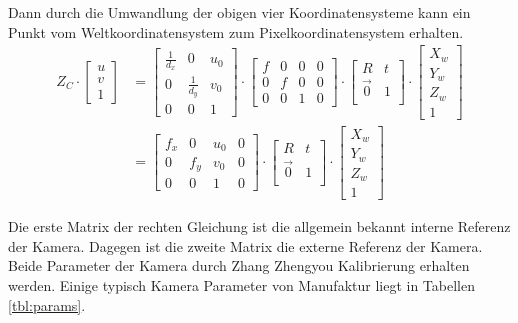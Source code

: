 Dann durch die Umwandlung der obigen vier Koordinatensysteme kann ein Punkt vom Weltkoordinatensystem zum Pixelkoordinatensystem erhalten.
\begin{equation}
\begin{split}
   Z_C \cdot \begin{bmatrix}
	u \\  
	v \\
	1
	\end{bmatrix} & = \begin{bmatrix}
	\frac{1}{d_x} 			& 0 			& u_0	\\
	0	 					& \frac{1}{d_y} & v_0	\\
	0     					& 0 			& 1	
	\end{bmatrix} \cdot \begin{bmatrix}
	f & 0 & 0 & 0	\\
	0 & f & 0 & 0	\\
	0 & 0 & 1 & 0	
	\end{bmatrix} \cdot \begin{bmatrix}
	R & t	\\
	\vec{0}	& 1 \\
	\end{bmatrix} \cdot \begin{bmatrix}
	X_w \\  
	Y_w \\
	Z_w \\
	1
	\end{bmatrix} \\
	& = \begin{bmatrix}
	f_x & 0 & u_0 & 0	\\
	0 & f_y & v_0 & 0	\\
	0 & 0 & 1 & 0	
	\end{bmatrix} \cdot \begin{bmatrix}
	R & t	\\
	\vec{0}	& 1 \\
	\end{bmatrix} \cdot \begin{bmatrix}
	X_w \\  
	Y_w \\
	Z_w \\
	1
	\end{bmatrix}
\end{split}	
\end{equation}

Die erste Matrix der rechten Gleichung ist die allgemein bekannt interne Referenz der Kamera. Dagegen ist die zweite Matrix die externe Referenz der Kamera. Beide Parameter der Kamera durch Zhang Zhengyou \cite{zhangzhengyou} Kalibrierung erhalten werden. Einige typisch Kamera Parameter von Manufaktur liegt in Tabellen \ref{tbl:params}.

